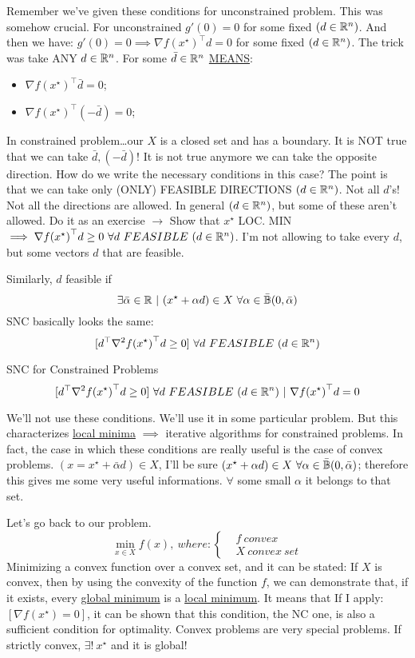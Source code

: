 Remember we've given these conditions for unconstrained problem. This was somehow crucial. For unconstrained $g'(0) = 0$ for some fixed $(d\in\mathbb{R}^n)$. And then we have: $g'(0) = 0 \implies \nabla{f(x^\star)}^\top d=0$ for some fixed $(d\in\mathbb{R}^n)$. The trick was take ANY $d\in\mathbb{R}^n$. For some $\bar{d}\in\mathbb{R}^n$ \underline{MEANS}:
\begin{itemize}
\item $\nabla{f(x^\star)}^\top \bar{d}=0$;
\item $\nabla{f(x^\star)}^\top (-\bar{d})=0$;
\end{itemize}
In constrained problem\dots our $X$ is a closed set and has a boundary. It is NOT true that we can take $\bar{d},(-\bar{d})$! It is not true anymore we can take the opposite direction. How do we write the necessary conditions in this case? The point is that we can take only (ONLY) FEASIBLE DIRECTIONS $(d\in\mathbb{R}^n)$. Not all $d$'s! Not all the directions are allowed. In general $(d\in\mathbb{R}^n)$, but some of these aren't allowed. Do it as an exercise $\rightarrow$ Show that $x^\star$ LOC. MIN $\implies \nabla{f(x^\star)}^\top d \geq 0\ \forall d\ FEASIBLE\ (d\in\mathbb{R}^n)$. I'm not allowing to take every $d$, but some vectors $d$ that are feasible.

Similarly, $d$ feasible if
\[
	\exists \bar{\alpha}\in\R\ |\ (x^\star +\alpha d) \in X\ \forall \alpha\in \cball(0,\bar{\alpha})
\]
SNC basically looks the same:
\[
	[d^\top \nabla^2{f(x^\star)}^\top d \geq 0]\ \forall d\ FEASIBLE\ (d\in\R^n)
\]	

\begin{thrm}{SNC for Constrained Problems}
\[
	[d^\top \nabla^2{f(x^\star)}^\top d \geq 0]\ \forall d\ FEASIBLE\ (d\in\R^n)\ |\ \nabla{f(x^\star)}^\top d = 0
\]
\end{thrm}

We'll not use these conditions. We'll use it in some particular problem. But this characterizes \underline{local minima} $\implies$ iterative algorithms for constrained problems.
In fact, the case in which these conditions are really useful is the case of convex problems. $(x=x^\star + \bar{\alpha}d) \in X$, I'll be sure $(x^\star +\alpha d) \in X\ \forall \alpha\in\cball(0,\bar{\alpha})$; therefore this gives me some very useful informations. $\forall$ some small $\alpha$ it belongs to that set.

Let's go back to our problem.
\[
	\min_{x\in X}{f(x)},\ where: \left\{
	\begin{aligned}
	&f\ convex\\
	&X\ convex\ set
	\end{aligned} 
	\right.
\]
Minimizing a convex function over a convex set, and it can be stated: If $X$ is convex, then by using the convexity of the function $f$, we can demonstrate that, if it exists, every \underline{global minimum} is a \underline{local minimum}. It means that If I apply: $[\nabla{f(x^\star)}=0]$, it can be shown that this condition, the NC one, is also a sufficient condition for optimality. Convex problems are very special problems. If strictly convex, $\exists!\ x^\star$ and it is global!

